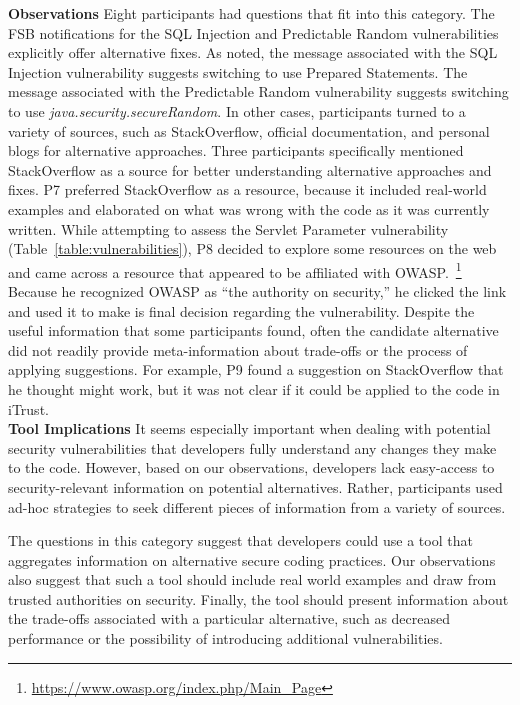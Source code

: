 \documentclass[conference]{IEEEtran}
\begin{document}
\noindent\textbf{Observations}
Eight participants had questions that fit into this category. 
The FSB notifications for the SQL Injection and Predictable Random vulnerabilities explicitly offer alternative fixes. 
As noted, the message associated with the SQL Injection vulnerability suggests switching to use Prepared Statements. 
The message associated with the Predictable Random vulnerability suggests switching to use \textit{java.security.secureRandom}. 
In other cases, participants turned to a variety of sources, such as StackOverflow, official documentation, and personal blogs for alternative approaches. 
Three participants specifically mentioned StackOverflow as a source for better understanding alternative approaches and fixes. 
P7 preferred StackOverflow as a resource, because it included real-world examples and elaborated on what was wrong with the code as it was currently written.  
While attempting to assess the Servlet Parameter vulnerability (Table~\ref{table:vulnerabilities}), P8 decided to explore some resources on the web and came across a resource that appeared to be affiliated with OWASP.~\footnote{\url{https://www.owasp.org/index.php/Main_Page}} 
Because he recognized OWASP as ``the authority on security,'' he clicked the link and used it to make is final decision regarding the vulnerability. 
Despite the useful information that some participants found, often the candidate alternative did not readily provide meta-information about trade-offs or the process of applying suggestions. 
For example, P9 found a suggestion on StackOverflow that he thought might work, but it was not clear if it could be applied to the code in iTrust. 
\\

\noindent\textbf{Tool Implications} 
It seems especially important when dealing with potential security vulnerabilities that developers fully understand any changes they make to the code. 
However, based on our observations, developers lack easy-access to security-relevant information on potential alternatives. 
Rather, participants used ad-hoc strategies to seek different pieces of information from a variety of sources. 

The questions in this category suggest that developers could use a tool that aggregates information on alternative secure coding practices.
Our observations also suggest that such a tool should include real world examples and draw from trusted authorities on security.
Finally, the tool should present information about the trade-offs associated with a particular alternative, such as decreased performance or the possibility of introducing additional vulnerabilities. 
\end{document}
